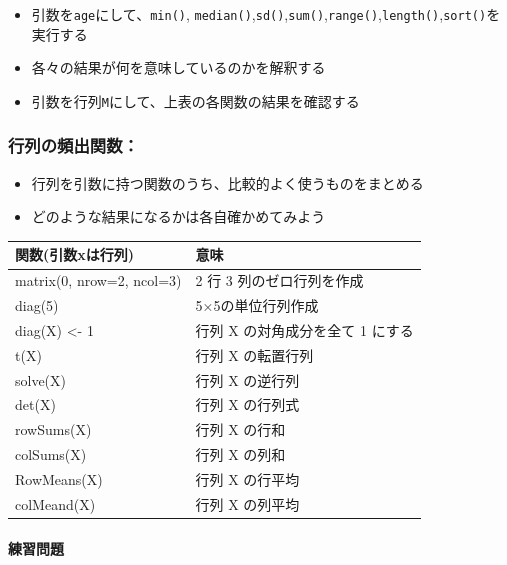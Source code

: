 \documentclass[
]{book}
\providecommand{\tightlist}{%
  \setlength{\itemsep}{0pt}\setlength{\parskip}{0pt}}
\begin{document}
\begin{itemize}
\tightlist
\item
  引数を\texttt{age}にして、\texttt{min()}, \texttt{median()},\texttt{sd()},\texttt{sum()},\texttt{range()},\texttt{length()},\texttt{sort()}を実行する
\item
  各々の結果が何を意味しているのかを解釈する
\item
  引数を行列\texttt{M}にして、上表の各関数の結果を確認する
\end{itemize}

\hypertarget{ux884cux5217ux306eux983bux51faux95a2ux6570}{%
\subsubsection*{行列の頻出関数：}\label{ux884cux5217ux306eux983bux51faux95a2ux6570}}

\begin{itemize}
\tightlist
\item
  行列を引数に持つ関数のうち、比較的よく使うものをまとめる
\item
  どのような結果になるかは各自確かめてみよう
\end{itemize}

\begin{longtable}[]{@{}ll@{}}
\toprule()
関数(引数xは行列) & 意味 \\
\midrule()
\endhead
matrix(0, nrow=2, ncol=3) & 2 行 3 列のゼロ行列を作成 \\
diag(5) & 5×5の単位行列作成 \\
diag(X) \textless- 1 & 行列 X の対角成分を全て 1 にする \\
t(X) & 行列 X の転置行列 \\
solve(X) & 行列 X の逆行列 \\
det(X) & 行列 X の行列式 \\
rowSums(X) & 行列 X の行和 \\
colSums(X) & 行列 X の列和 \\
RowMeans(X) & 行列 X の行平均 \\
colMeand(X) & 行列 X の列平均 \\
\bottomrule()
\end{longtable}

\hypertarget{ux7df4ux7fd2ux554fux984c-5}{%
\paragraph*{練習問題}\label{ux7df4ux7fd2ux554fux984c-5}}
\end{document}
